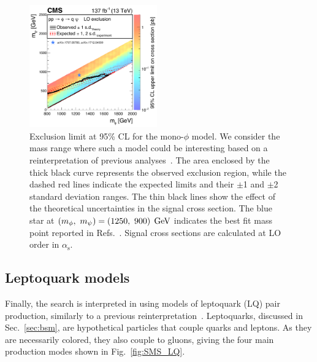 \begin{figure}[htbp]
 \centering
   \includegraphics[width=0.49\textwidth]{figs/results/rpvMonoPhi_XSEC_paperXSEC_star_arxiv.pdf}
   \caption{Exclusion limit at 95\% CL for the mono-$\phi$ model.
     We consider the mass range where such a model could be interesting based on a
     reinterpretation of previous analyses~\cite{Asadi1,Asadi2}.
     The area enclosed by the thick black curve represents the observed exclusion region,
     while the dashed red lines indicate the expected limits and
     their $\pm$1 and $\pm$2 standard deviation ranges.
     The thin black lines show the effect of the theoretical
     uncertainties in the signal cross section.
     The blue star at $\left(m_{\phi},~m_{\psi}\right)=\left(1250,~900\right)\;\text{Ge\hspace{-.08em}V}$ indicates the best fit mass point reported in Refs.~\cite{Asadi1,Asadi2}.
     Signal cross sections are calculated at LO order
     in $\alpha_{\mathrm{s}}$.}
   \label{fig:monophi}
\end{figure}

\subsection {Leptoquark models}

Finally, the search is interpreted in using models of leptoquark (LQ) pair production,
similarly to a previous reinterpretation~\cite{CMS:mt2LQ}. Leptoquarks, discussed in
Sec.~\ref{sec:bsm}, are hypothetical particles that couple quarks and leptons. As they
are necessarily colored, they also couple to gluons, giving the four main production
modes shown in Fig.~\ref{fig:SMS_LQ}.

